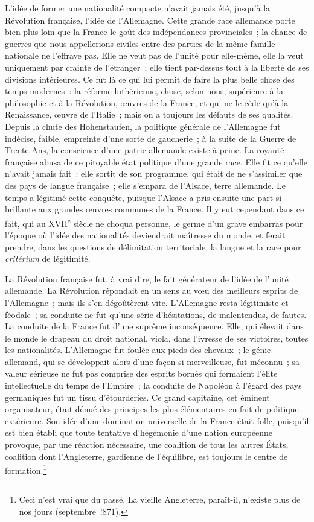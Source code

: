 \documentclass[french,twoside]{book} %
\begin{document}
L’idée de former une nationalité compacte n’avait jamais été, jusqu’à la Révolution française, l’idée de l’Allemagne. Cette grande race allemande porte bien plus loin que la France le goût des indépendances provinciales ; la chance de guerres que nous appellerions civiles entre des parties de la même famille nationale ne l’effraye pas. Elle ne veut pas de l’unité pour elle-même, elle la veut uniquement par crainte de l’étranger ; elle tient par-dessus tout à la liberté de ses divisions intérieures. Ce fut là ce qui lui permit de faire la plus belle chose des temps modernes : la réforme luthérienne, chose, selon nous, supérieure à la philosophie et à la Révolution, œuvres de la France, et qui ne le cède qu’à la Renaissance, œuvre de l’Italie ; mais on a toujours les défauts de ses qualités. Depuis la chute des Hohenstaufen, la politique générale de l’Allemagne fut indécise, faible, empreinte d’une sorte de gaucherie ; à la suite de la Guerre de Trente Ans, la conscience d’une patrie allemande existe à peine. La royauté française abusa de ce pitoyable état politique d’une grande race. Elle fit ce qu’elle n’avait jamais fait : elle sortit de son programme, qui était de ne s’assimiler que des pays de langue française ; elle s’empara de l’Alsace, terre allemande. Le temps a légitimé cette conquête, puisque l’Alsace a pris ensuite une part si brillante aux grandes œuvres communes de la France. Il y eut cependant dans ce fait, qui au XVII\textsuperscript{e} siècle ne choqua personne, le germe d’un grave embarras pour l’époque où l’idée des nationalités deviendrait maîtresse du monde, et ferait prendre, dans les questions de délimitation territoriale, la langue et la race pour {\itshape critérium} de légitimité.\par
La Révolution française fut, à vrai dire, le fait générateur de l’idée de l’unité allemande. La Révolution répondait en un sens au vœu des meilleurs esprits de l’Allemagne ; mais ils s’en dégoûtèrent vite. L’Allemagne resta légitimiste et féodale ; sa conduite ne fut qu’une série d’hésitations, de malentendus, de fautes. La conduite de la France fut d’une suprême inconséquence. Elle, qui élevait dans le monde le drapeau du droit national, viola, dans l’ivresse de ses victoires, toutes les nationalités. L’Allemagne fut foulée aux pieds des chevaux ; le génie allemand, qui se développait alors d’une façon si merveilleuse, fut méconnu ; sa valeur sérieuse ne fut pas comprise des esprits bornés qui formaient l’élite intellectuelle du temps de l’Empire ; la conduite de Napoléon à l’égard des pays germaniques fut un tissu d’étourderies. Ce grand capitaine, cet éminent organisateur, était dénué des principes les plus élémentaires en fait de politique extérieure. Son idée d’une domination universelle de la France était folle, puisqu’il est bien établi que toute tentative d’hégémonie d’une nation européenne provoque, par une réaction nécessaire, une coalition de tous les autres États, coalition dont l’Angleterre, gardienne de l’équilibre, est toujours le centre de formation.\footnote{Ceci n’est vrai que du passé. La vieille Angleterre, paraît-il, n’existe plus de nos jours (septembre !871).}\par
\end{document}
